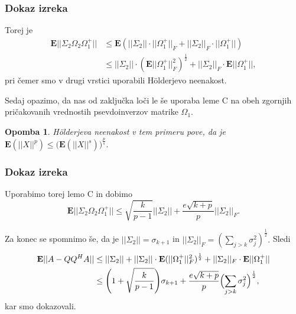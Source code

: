 \documentclass{beamer}
\newtheorem{trditev}{Trditev}
\newtheorem{opomba}{Opomba}
\begin{document}
\begin{frame}
\frametitle{Dokaz izreka}

Torej je 
\begin{align*}
\textbf{E}|| \Sigma_2 \Omega_2 \Omega_1^+|| &\leq \textbf{E}(|| \Sigma_2 || \cdot|| \Omega_1^+||_F + || \Sigma_2 ||_F \cdot || \Omega_1^+||) \\
 &\leq ||\Sigma_2|| \cdot (\textbf{E}|| \Omega_1^+||_F^2)^{\frac{1}{2}} + ||\Sigma_2||_F \cdot \textbf{E}|| \Omega_1^+||,
\end{align*}
pri čemer smo v drugi vrstici uporabili H\"olderjevo neenakost.

Sedaj opazimo, da nas od zaključka loči le še uporaba leme C na obeh zgornjih pričakovanih vrednostih psevdoinverzov matrike $\Omega_1.$

\begin{opomba}
H\"olderjeva neenakost v tem primeru pove, da je $\textbf{E}(||X||^p) \leq \bigl ( \textbf{E}(||X||^s) \bigr ) ^{\frac{p}{s}}.$
\end{opomba}

\end{frame}
\begin{frame}
\frametitle{Dokaz izreka}

Uporabimo torej lemo C in dobimo
$$\textbf{E}|| \Sigma_2 \Omega_2 \Omega_1^+|| \leq \sqrt{\frac{k}{p-1}} || \Sigma_2|| + \frac{e\sqrt{k + p}}{p} || \Sigma_2|| _F.$$

Za konec se spomnimo še, da je $||\Sigma_2|| = \sigma_{k+1}$ in $||\Sigma_2||_F = (\sum_{j>k} \sigma_j^2)^{\frac{1}{2}}.$
Sledi
\begin{align*}
\textbf{E}|| A - QQ^HA|| &\leq ||\Sigma_2|| +  ||\Sigma_2|| \cdot \textbf{E}(|| \Omega_1^+||_F^2)^{\frac{1}{2}} + ||\Sigma_2||_F \cdot \textbf{E}|| \Omega_1^+|| \\
& \leq  \Biggl (1 + \sqrt{\frac{k}{p-1}} \Biggr ) \sigma_{k+1} + \frac{e\sqrt{k+p}}{p} \Bigl ( \sum_{j>k} \sigma_j^2 \Bigr)^{\frac{1}{2}},
\end{align*}
kar smo dokazovali.
\end{frame}


%
%
%
%
%
%
%
\end{document}
